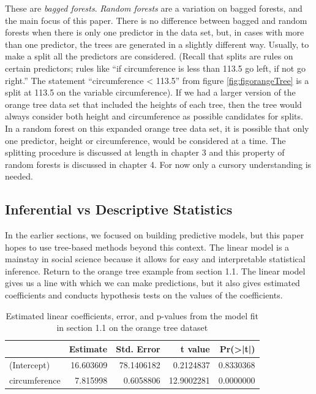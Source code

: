 \documentclass[12pt,twoside]{reedthesis}
\begin{document}
  These are \emph{bagged forests}. \emph{Random forests} are a variation
  on bagged forests, and the main focus of this paper. There is no
  difference between bagged and random forests when there is only one
  predictor in the data set, but, in cases with more than one predictor,
  the trees are generated in a slightly different way. Usually, to make a
  split all the predictors are considered. (Recall that splits are rules
  on certain predictors; rules like ``if circumference is less than 113.5
  go left, if not go right.'' The statement ``circumference \textless{}
  113.5'' from figure \ref{fig:figorangeTree} is a split at 113.5 on the
  variable circumference). If we had a larger version of the orange tree
  data set that included the heights of each tree, then the tree would
  always consider both height and circumference as possible candidates for
  splits. In a random forest on this expanded orange tree data set, it is
  possible that only one predictor, height or circumference, would be
  considered at a time. The splitting procedure is discussed at length in
  chapter 3 and this property of random forests is discussed in chapter 4.
  For now only a cursory understanding is needed.
  
  \subsection{Inferential vs Descriptive
  Statistics}\label{inferential-vs-descriptive-statistics}
  
  In the earlier sections, we focused on building predictive models, but
  this paper hopes to use tree-based methods beyond this context. The
  linear model is a mainstay in social science because it allows for easy
  and interpretable statistical inference. Return to the orange tree
  example from section 1.1. The linear model gives us a line with which we
  can make predictions, but it also gives estimated coefficients and
  conducts hypothesis tests on the values of the coefficients.
  
  \begin{table}
  
  \caption{\label{tab:unnamed-chunk-11}\label{tab:tablmcoef}Estimated linear coefficients, error, and p-values from the model fit in section 1.1 on the orange tree dataset}
  \centering
  \begin{tabular}[t]{l|r|r|r|r}
  \hline
    & Estimate & Std. Error & t value & Pr(>|t|)\\
  \hline
  (Intercept) & 16.603609 & 78.1406182 & 0.2124837 & 0.8330368\\
  \hline
  circumference & 7.815998 & 0.6058806 & 12.9002281 & 0.0000000\\
  \hline
  \end{tabular}
  \end{table}
  
\end{document}
